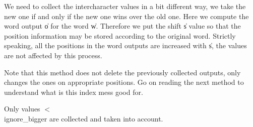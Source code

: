 We need to collect the intercharacter values in a bit different way,
we take the new one if and only if the new one wins over the old one.
Here we compute the word output \|o for the word \|w. Therefore we put
the shift \|s value so that the position information may be stored
according to the original word. Strictly speaking, all the positions in
the word outputs are increased with \|s, the values are not affected by
this process.

Note that this method does not delete the previously collected outputs,
only changes the ones on appropriate positions. Go on reading the next
method to understand what is this index mess good for.

Only values $<$\\{ignore\_bigger} are collected and taken into account.

